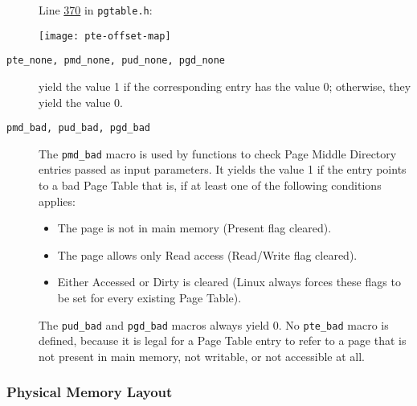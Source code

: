 \begin{description}
  Line \href{http://lxr.linux.no/linux+v2.6.11/include/asm-i386/pgtable.h\#L370}{370} in
  \texttt{pgtable.h}:
  \begin{center}
    \texttt{[image: pte-offset-map]}
  \end{center}

\item[\texttt{pte\_none, pmd\_none, pud\_none, pgd\_none}] yield the value 1 if the
  corresponding entry has the value 0; otherwise, they yield the value 0.
\item[\texttt{pmd\_bad, pud\_bad, pgd\_bad}] The \texttt{pmd\_bad} macro is used by functions to
  check Page Middle Directory entries passed as input parameters. It yields the value 1 if
  the entry points to a bad Page Table that is, if at least one of the following
  conditions applies:
  \begin{itemize}
  \item The page is not in main memory (Present flag cleared).
  \item The page allows only Read access (Read/Write flag cleared).
  \item Either Accessed or Dirty is cleared (Linux always forces these flags to be set for
    every existing Page Table).
  \end{itemize}
  The \texttt{pud\_bad} and \texttt{pgd\_bad} macros always yield 0. No \texttt{pte\_bad} macro is
  defined, because it is legal for a Page Table entry to refer to a page that is not
  present in main memory, not writable, or not accessible at all.
\end{description}

\subsubsection{Physical Memory Layout}

